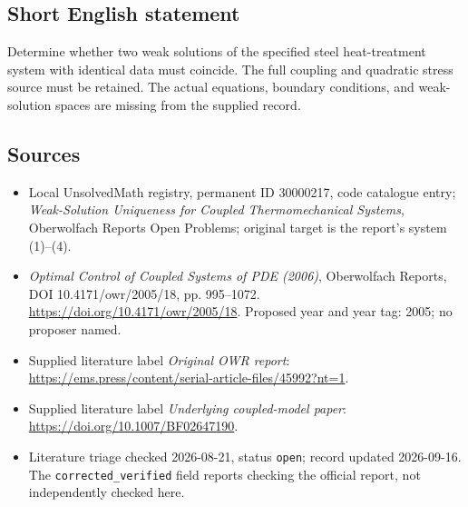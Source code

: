 \documentclass[11pt]{article}
\begin{document}
\subsection{Short English statement}
Determine whether two weak solutions of the specified steel heat-treatment system with identical data must coincide. The full coupling and quadratic stress source must be retained. The actual equations, boundary conditions, and weak-solution spaces are missing from the supplied record.
\subsection{Sources}
\begin{itemize}\item Local UnsolvedMath registry, permanent ID 30000217, code catalogue entry; \emph{Weak-Solution Uniqueness for Coupled Thermomechanical Systems}, Oberwolfach Reports Open Problems; original target is the report's system (1)--(4).\item \emph{Optimal Control of Coupled Systems of PDE (2006)}, Oberwolfach Reports, DOI 10.4171/owr/2005/18, pp. 995--1072. \url{https://doi.org/10.4171/owr/2005/18}. Proposed year and year tag: 2005; no proposer named.\item Supplied literature label \emph{Original OWR report}: \url{https://ems.press/content/serial-article-files/45992?nt=1}.\item Supplied literature label \emph{Underlying coupled-model paper}: \url{https://doi.org/10.1007/BF02647190}.\item Literature triage checked 2026-08-21, status \texttt{open}; record updated 2026-09-16. The \texttt{corrected\_verified} field reports checking the official report, not independently checked here.\end{itemize}
\end{document}

